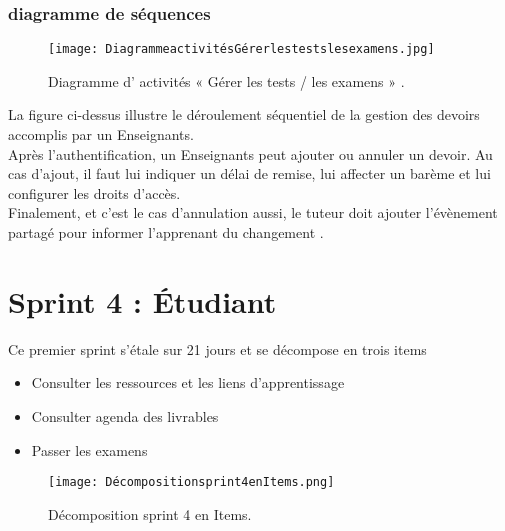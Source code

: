\subsubsection{diagramme de séquences }
\begin{figure}[ht]
	\centering
	\texttt{[image: DiagrammeactivitésGérerlestestslesexamens.jpg]}
	\caption{Diagramme d' activités « Gérer les tests / les examens » .}
	\label{fig:Diagramme d' activités  Gérer les tests / les examens }
\end{figure}
\FloatBarrier
{}

La figure ci-dessus illustre le déroulement séquentiel de la gestion des devoirs accomplis par un
Enseignants.\\
Après l’authentification, un Enseignants peut ajouter ou annuler un devoir. Au cas d’ajout, il faut lui
indiquer un délai de remise, lui affecter un barème et lui configurer les droits d’accès.\\
Finalement, et c’est le cas d’annulation aussi, le tuteur doit ajouter l’évènement partagé pour informer l’apprenant du changement .
\clearpage
\section{Sprint 4 : Étudiant}
\label{sec:conception}

\begin{fquote}
Ce premier sprint s’étale sur 21 jours et se décompose en trois items
\end{fquote}
\smallskip
\begin{itemize}[label=$\diamond$]
	\item Consulter les ressources et les liens d'apprentissage
	 
    \item Consulter agenda des livrables

    \item Passer les examens

\end{itemize}
\medskip
\medskip
\medskip
\medskip
\medskip
\medskip
\medskip
\medskip
\medskip
\medskip
\begin{figure}[ht]
	\centering
	\texttt{[image: Décompositionsprint4enItems.png]}
	\caption{Décomposition sprint 4 en Items.}
	\label{fig:Démposition sprint 4 en Items}
\end{figure}
\FloatBarrier
\clearpage



